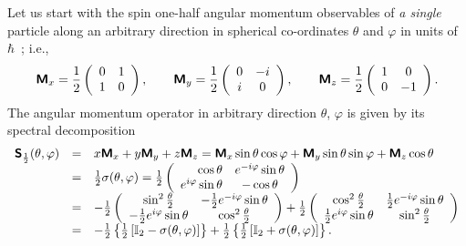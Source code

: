 {Let us start with the spin one-half angular momentum observables of {\em a single} particle along an arbitrary direction
in spherical co-ordinates $\theta$ and $\varphi$
in units of $\hbar$~\cite{schiff-55}; i.e.,
\begin{equation}
\textsf{\textbf{M}}_x=
\frac{1}{2}
\left(
\begin{array}{cccccccccc}
0&1\\
1&0
\end{array}
\right),
\qquad
\textsf{\textbf{M}}_y=
\frac{1}{2}
\left(
\begin{array}{cccccccccc}
0&-i\\
i&0
\end{array}
\right),
\qquad
\textsf{\textbf{M}}_z=
\frac{1}{2}
\left(
\begin{array}{cccccccccc}
1&0\\
0&-1
\end{array}
\right).
\end{equation}
The angular momentum operator in arbitrary direction $\theta$, $\varphi$ is given by its spectral decomposition
\begin{equation}
\begin{array}{rcl}
\textsf{\textbf{S}}_\frac{1}{2} (\theta ,\varphi) &=&
x\textsf{\textbf{M}}_x
+
y\textsf{\textbf{M}}_y
+
z\textsf{\textbf{M}}_z
=
 \textsf{\textbf{M}}_x  \sin \theta \cos \varphi
+
\textsf{\textbf{M}}_y   \sin \theta \sin \varphi
+
\textsf{\textbf{M}}_z   \cos \theta
\\
&=&   \frac{1}{2}\sigma (\theta ,\varphi)=
{1\over 2}
\left(\begin{array}{rcl}
\cos \theta &  e^{-i \varphi }\sin \theta \\
e^{i \varphi }\sin \theta & - \cos \theta
\end{array}
\right)\\
&=&
-
\frac{1}{2}
\left(
\begin{array}{cc}
 \sin ^2 \frac{\theta }{2} & -\frac{1}{2} e^{-i \varphi } \sin \theta  \\
 -\frac{1}{2} e^{i \varphi } \sin \theta  & \cos ^2\frac{\theta  }{2}
\end{array}
\right)
+
\frac{1}{2}
 \left(
\begin{array}{cc}
 \cos ^2 \frac{\theta }{2} & \frac{1}{2} e^{-i \varphi } \sin \theta  \\
 \frac{1}{2} e^{i \varphi } \sin \theta  & \sin ^2 \frac{\theta }{2}
\end{array}
\right)\\
&=&
-
\frac{1}{2}
\left\{
\frac{1}{2}
\left[
{\Bbb I}_2 - \sigma (\theta ,\varphi)
\right]
\right\}
+
\frac{1}{2}
\left\{
\frac{1}{2}
\left[
{\Bbb I}_2 + \sigma (\theta ,\varphi)
\right]
\right\}
.
\end{array}
\label{e-2009-gtq-s2}
\end{equation}

}
